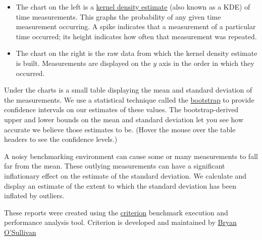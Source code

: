 \begin{itemize}
\item The chart on the left is a \href{http://en.wikipedia.org/wiki/Kernel_density_estimation}{kernel
    density estimate} (also known as a KDE) of time
    measurements. This graphs the probability of any given time
    measurement occurring. A spike indicates that a measurement of a
    particular time occurred; its height indicates how often that
    measurement was repeated.
\item The chart on the right is the raw data from which the kernel
    density estimate is built.  Measurements are displayed on
    the $y$ axis in the order in which they occurred.
\end{itemize}
   
Under the charts is a small table displaying the mean and standard
deviation of the measurements.  We use a statistical technique
called
the 
\href{http://en.wikipedia.org/wiki/Bootstrapping_(statistics)}{bootstrap}
to provide confidence intervals on our estimates of these values.
The bootstrap-derived upper and lower bounds on the mean and
standard deviation let you see how accurate we believe those
estimates to be. (Hover the mouse over the table headers to see
the confidence levels.)
   
A noisy benchmarking environment can cause some or many
measurements to fall far from the mean. These outlying
measurements can have a significant inflationary effect on the
estimate of the standard deviation. We calculate and display an
estimate of the extent to which the standard deviation has been
inflated by outliers.

These reports were created using the
\href{http://hackage.haskell.org/package/criterion}{criterion}
benchmark execution and performance analysis tool.
Criterion is developed and maintained
by \href{http://www.serpentine.com/blog/}{Bryan O'Sullivan}
